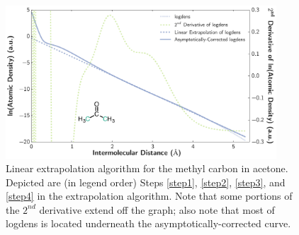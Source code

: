     \begin{figure}
    \includegraphics[width=0.9\textwidth]{workflow/acetone_extrapolation.pdf}
    \caption{
        Linear extrapolation algorithm for the methyl carbon in acetone.
Depicted are (in legend order) Steps \ref{step1}, \ref{step2}, \ref{step3},
and \ref{step4} in the extrapolation algorithm. Note that some portions of the
$2^{nd}$ derivative extend off the graph; also note that most of logdens
is located underneath the asymptotically-corrected curve.
           		  }
    \label{fig:acetone-extrapolation}        
    \end{figure}



